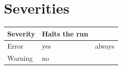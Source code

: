 \section{Severities}

\begin{tabular}{ll}
\toprule
Severity & Halts the run \\
\midrule
Error & yes & always \\
Warning & no \\
\bottomrule
\end{tabular}
